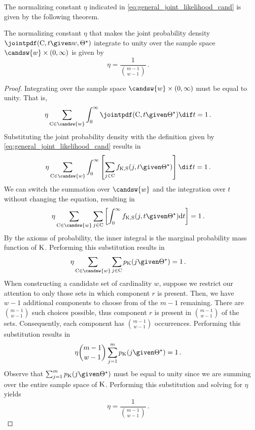 \documentclass[../main.tex]{subfiles}
\begin{document}
The normalizing constant $\eta$ indicated in \cref{eq:general_joint_likelihood_cand} is given by the following theorem.
\begin{theorem}
The normalizing constant $\eta$ that makes the joint probability density $\jointpdf(\cand, t \given w, \tparam\sysparam)$ integrate to unity over the sample space $\candsw{w} \times \left(0,\infty\right)$ is given by
\begin{equation}
    \eta = \frac{1}{\binom{m-1}{w-1}}\,.
\end{equation}
\end{theorem}
\begin{proof}
Integrating over the sample space $\candsw{w} \times \left(0,\infty\right)$ must be equal to unity. That is,
\begin{equation}
    \eta \sum_{\cand \in \candsw{w}} \int_{0}^{\infty} \jointpdf(\cand, t \given \tparam\sysparam) \dif t = 1\,.
\end{equation}
Substituting the joint probability density with the definition given by \cref{eq:general_joint_likelihood_cand} results in
\begin{equation}
    \eta \sum_{\cand \in \candsw{w}} \int_{0}^{\infty} \left[ \sum_{j \in \cand} \pdf_{\RV{K}, \sv}(j, t \given \tparam\sysparam) \right] \dif t = 1\,.
\end{equation}
We can switch the summation over $\candsw{w}$ and the integration over $t$ without changing the equation, resulting in
\begin{equation}
    \eta \sum_{\cand \in \candsw{w}} \sum_{j \in \cand} \left[ \int_{0}^{\infty} \pdf_{\RV{K}, \sv}(j, t \given \tparam\sysparam) \mathrm{d}t \right] = 1\,.
\end{equation}
By the axioms of probability, the inner integral is the marginal probability mass function of $\mathrm{K}$. Performing this substitution results in
\begin{equation}
    \eta \sum_{\cand \in \candsw{w}} \sum_{j \in \cand} \pmf_{\RV{K}}(j \given \tparam\sysparam) = 1\,.
\end{equation}
When constructing a candidate set of cardinality $w$, suppose we restrict our attention to only those sets in which component $r$ is present. Then, we have $w-1$ additional components to choose from of the $m-1$ remaining. There are $\binom{m-1}{w-1}$ such choices possible, thus component $r$ is present in $\binom{m-1}{w-1}$ of the sets. Consequently, each component has $\binom{m-1}{w-1}$ occurrences. Performing this substitution results in
\begin{equation}
    \label{eq:proof_joint_like_marginal}
    \eta \binom{m-1}{w-1} \sum_{j=1}^{m} \pmf_{\RV{K}}(j \given \tparam{\sysparam}) = 1\,.
\end{equation}
Observe that $\sum_{j=1}^{m} \pmf_{\RV{K}}(j \given \tparam{\sysparam})$ must be equal to unity since we are summing over the entire sample space of $\mathrm{K}$. Performing this substitution and solving for $\eta$ yields
\begin{equation}
    \eta = \frac{1}{\binom{m-1}{w-1}}\,.
\end{equation}
\end{proof}
\end{document}
